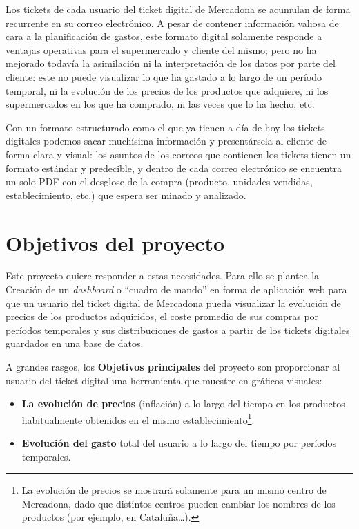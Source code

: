 \documentclass[a4paper,12pt]{report}
\begin{document}
		Los tickets de cada usuario del ticket digital de Mercadona se acumulan de forma recurrente en su correo electrónico. A pesar de contener información valiosa de cara a la planificación de gastos, este formato digital solamente responde a ventajas operativas para el supermercado y cliente del mismo; pero no ha mejorado todavía la asimilación ni la interpretación de los datos por parte del cliente: este no puede visualizar lo que ha gastado a lo largo de un período temporal, ni la evolución de los precios de los productos que adquiere, ni los supermercados en los que ha comprado, ni las veces que lo ha hecho, etc.
		
		Con un formato estructurado como el que ya tienen a día de hoy los tickets digitales podemos sacar muchísima información y presentársela al cliente de forma clara y visual: los asuntos de los correos que contienen los tickets tienen un formato estándar y predecible, y dentro de cada correo electrónico se encuentra un solo PDF con el desglose de la compra (producto, unidades vendidas, establecimiento, etc.) que espera ser minado y analizado.
 
		\section{Objetivos del proyecto} %
		\label{section:objetivosProyecto}
		
		Este proyecto quiere responder a estas necesidades. Para ello se plantea la Creación de un \textit{dashboard} o ``cuadro de mando'' en forma de aplicación web para que un usuario del ticket digital de Mercadona pueda visualizar la evolución de precios de los productos adquiridos, el coste promedio de sus compras por períodos temporales y sus distribuciones de gastos a partir de los tickets digitales guardados en una base de datos.
		
		A grandes rasgos, los \textbf{Objetivos principales} del proyecto son proporcionar al usuario del ticket digital una herramienta que muestre en gráficos visuales:

					
		\begin{itemize}
			\setlength{\itemsep}{-.5em}
			\item \textbf{La evolución de precios} (inflación) a lo largo del tiempo en los productos habitualmente obtenidos en el mismo establecimiento\footnote{La evolución de precios se mostrará solamente para un mismo centro de Mercadona, dado que distintos centros pueden cambiar los nombres de los productos (por ejemplo, en Cataluña…).}.
			\item \textbf{Evolución del gasto} total del usuario a lo largo del tiempo por períodos temporales.
		\end{itemize}
		
\end{document}
